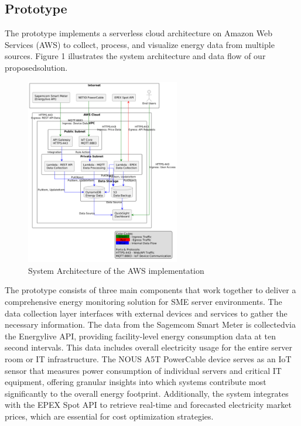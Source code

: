 \subsection{Prototype}
The prototype implements a serverless cloud architecture on Amazon Web Services (AWS) to collect,
process, and visualize energy data from multiple sources. Figure 1 illustrates the system
architecture and data flow of our proposedsolution.

\begin{figure}[htbp]
    \centering
    \includegraphics[width=0.6\textwidth]{fig/architecture2.png}
    \caption{System Architecture of the AWS implementation}
    \label{fig:architecture}
\end{figure}

The prototype consists of three main components that work together to deliver a comprehensive
energy monitoring solution for SME server environments. The data collection layer interfaces with
external devices and services to gather the necessary information. The data from the Sagemcom Smart
Meter is collectedvia the Energylive API, providing facility-level energy consumption data at
ten second intervals. This data includes overall electricity usage for the entire server room or IT
infrastructure. The NOUS A5T PowerCable device serves as an IoT sensor that measures power consumption
of individual servers and critical IT equipment, offering granular insights into which systems
contribute most significantly to the overall energy footprint. Additionally, the system integrates
with the EPEX Spot API to retrieve real-time and forecasted electricity market prices, which
are essential for cost optimization strategies.

